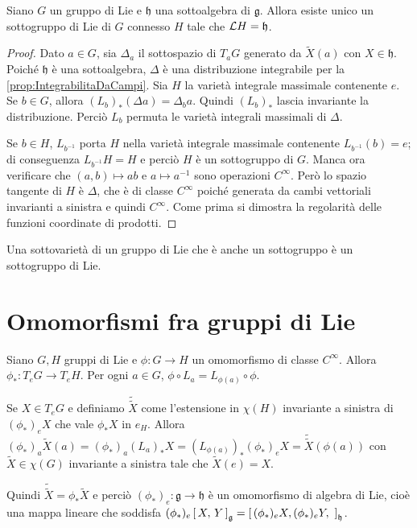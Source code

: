 \begin{theorem}
	Siano $G$ un gruppo di Lie e $\mathfrak h$ una sottoalgebra di $\mathfrak g$. Allora esiste unico un sottogruppo di Lie di $G$ connesso $H$ tale che $\mathcal L H = \mathfrak h$.
\end{theorem}
\begin{proof}
	Dato $a \in G$, sia $\Delta_a$ il sottospazio di $T_aG$ generato da $\tilde X(a)$ con $X\in \mathfrak h$.
	Poiché $\mathfrak h$ è una sottoalgebra, $\Delta$ è una distribuzione integrabile per la \cref{prop:IntegrabilitaDaCampi}.
	Sia $H$ la varietà integrale massimale contenente $e$. Se $b \in G$, allora $(L_b)_* (\Delta a) = \Delta_b a$. Quindi $(L_b)_*$ lascia invariante la distribuzione. Perciò $L_b$ permuta le varietà integrali massimali di $\Delta$.
	
	Se $b\in H$, $L_{b^{-1}}$ porta $H$ nella varietà integrale massimale contenente $L_{b^{-1}} (b) =e$; di conseguenza $L_{b^{-1}} H = H$ e perciò $H$ è un sottogruppo di $G$.
	Manca ora verificare che $(a,b) \mapsto ab$ e $a\mapsto a^{-1}$ sono operazioni $C^\infty$.
	Però lo spazio tangente di $H$ è $\Delta$, che è di classe $C^\infty$ poiché generata da cambi vettoriali invarianti a sinistra e quindi $C^\infty$.
	Come prima si dimostra la regolarità delle funzioni coordinate di prodotti.
\end{proof}

\begin{remark}
	Una sottovarietà di un gruppo di Lie che è anche un sottogruppo è un sottogruppo di Lie.
\end{remark}



\section{Omomorfismi fra gruppi di Lie}

Siano $G,H$ gruppi di Lie e $\phi : G\to H$ un omomorfismo di classe $C^\infty$.
Allora $\phi_* : T_eG \to T_eH$.
Per ogni $a \in G$, $\phi \circ L_a = L_{\phi(a)} \circ \phi$.

Se $X \in T_eG$ e definiamo $\tilde{\tilde X}$ come l'estensione in $\chi(H)$ invariante a sinistra di $(\phi_*)_eX $ che vale $\phi_*X$ in $e_H$.
Allora $(\phi_*)_a \tilde X(a) = (\phi_*)_a (L_a)_*X = (L_{\phi(a)})_* (\phi_*)_eX = \tilde{\tilde X} (\phi(a))$ con $\tilde X\in\chi(G)$ invariante a sinistra tale che $\tilde X(e) = X$.

Quindi $\tilde{\tilde X} = \phi_*\tilde X$ e perciò $(\phi_*)_e:\mathfrak g \to \mathfrak h$ è un omomorfismo di algebra di Lie, cioè una mappa lineare che soddisfa $(\phi_*)_e \left[\,X,\,Y\,\right] _{\mathfrak g} = \left[\, (\phi_*)_eX, (\phi_*)_eY ,\,\,\right]_{\mathfrak h}$.

